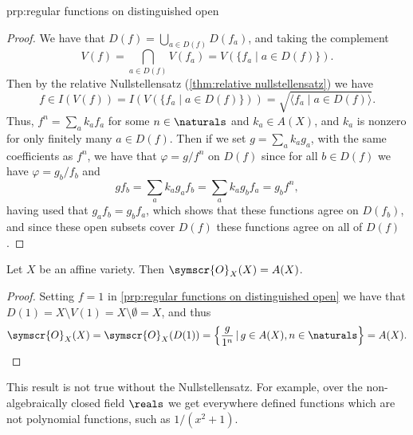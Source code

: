 \documentclass[fleqn]{NotesClass}
\newcommand{\sheaf}[1]{\symscr{#1}}
\begin{document}
\begin{prp}{}{prp:regular functions on distinguished open}
\begin{proof}
            
            We have that \(D(f) = \bigcup_{a \in D(f)} D(f_a)\), and taking the complement
            \begin{equation}
                V(f) = \bigcap_{a \in D(f)} V(f_a) = V(\{f_a \mid a \in D(f)\}).
            \end{equation}
            Then by the relative Nullstellensatz (\cref{thm:relative nullstellensatz}) we have
            \begin{equation}
                f \in I(V(f)) = I(V(\{f_a \mid a \in D(f)\})) = \sqrt{\langle f_a \mid a \in D(f) \rangle}.
            \end{equation}
            Thus, \(f^n = \sum_a k_a f_a\) for some \(n \in \naturals\) and \(k_a \in A(X)\), and \(k_a\) is nonzero for only finitely many \(a \in D(f)\).
            Then if we set \(g = \sum_a k_a g_a\), with the same coefficients as \(f^n\), we have that \(\varphi = g/f^n\) on \(D(f)\) since for all \(b \in D(f)\) we have \(\varphi = g_b / f_b\) and
            \begin{equation}
                gf_b = \sum_a k_a g_a f_b = \sum_a k_a g_b f_a = g_b f^n,
            \end{equation}
            having used that \(g_af_b = g_bf_a\), which shows that these functions agree on \(D(f_b)\), and since these open subsets cover \(D(f)\) these functions agree on all of \(D(f)\).
        \end{proof}
    \end{prp}
    
    \begin{crl}{}{}
        Let \(X\) be an affine variety.
        Then \(\sheaf{O}_X(X) = A(X)\).
        \begin{proof}
            Setting \(f = 1\) in \cref{prp:regular functions on distinguished open} we have that \(D(1) = X \setminus V(1) = X \setminus \emptyset = X\), and thus
            \begin{equation}
                \sheaf{O}_X(X) = \sheaf{O}_X(D(1)) = \left\{ \frac{g}{1^n} \,|\, g \in A(X), n \in \naturals \right\} = A(X). \qedhere
            \end{equation}
        \end{proof}
    \end{crl}
    
    This result is not true without the Nullstellensatz.
    For example, over the non-algebraically closed field \(\reals\) we get everywhere defined functions which are not polynomial functions, such as \(1/(x^2 + 1)\).
    
\end{document}
